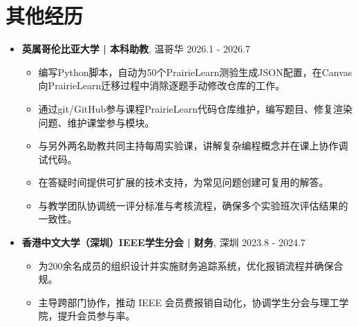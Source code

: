 \documentclass{resume}
\begin{document}
\section{其他经历}
\begin{itemize}[parsep=0.2ex]
  \item \textbf{英属哥伦比亚大学 | 本科助教}, 温哥华 \hfill 2026.1 - 2026.7
  \begin{itemize}
    \item 编写Python脚本，自动为50个PrairieLearn测验生成JSON配置，在Canvas向PrairieLearn迁移过程中消除逐题手动修改仓库的工作。
    \item 通过git/GitHub参与课程PrairieLearn代码仓库维护，编写题目、修复渲染问题、维护课堂参与模块。
    \item 与另外两名助教共同主持每周实验课，讲解复杂编程概念并在课上协作调试代码。
    \item 在答疑时间提供可扩展的技术支持，为常见问题创建可复用的解答。
    \item 与教学团队协调统一评分标准与考核流程，确保多个实验班次评估结果的一致性。
  \end{itemize}
  \item \textbf{香港中文大学（深圳）IEEE学生分会 | 财务}, 深圳 \hfill 2023.8 - 2024.7
  \begin{itemize}
    \item 为200余名成员的组织设计并实施财务追踪系统，优化报销流程并确保合规。
    \item 主导跨部门协作，推动 IEEE 会员费报销自动化，协调学生分会与理工学院，提升会员参与率。
  \end{itemize}
\end{itemize}

%
%
\end{document}
